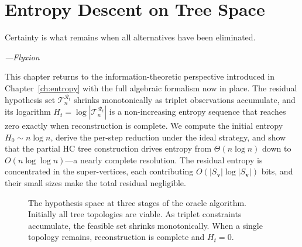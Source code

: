 \chapter{Entropy Descent on Tree Space}
\label{ch:entropy_descent}

\epigraph{%
  Certainty is what remains when all alternatives have been eliminated.%
}{\textit{---Flyxion}}

This chapter returns to the information-theoretic perspective introduced in Chapter~\ref{ch:entropy} with the full algebraic formalism now in place. The residual hypothesis set $\mathcal{T}_n^{\mathcal{R}_t}$ shrinks monotonically as triplet observations accumulate, and its logarithm $H_t = \log|\mathcal{T}_n^{\mathcal{R}_t}|$ is a non-increasing entropy sequence that reaches zero exactly when reconstruction is complete. We compute the initial entropy $H_0 \sim n\log n$, derive the per-step reduction under the ideal strategy, and show that the partial HC tree construction drives entropy from $\Theta(n\log n)$ down to $O(n\log\log n)$---a nearly complete resolution. The residual entropy is concentrated in the super-vertices, each contributing $O(|S_\mathbf{v}|\log|S_\mathbf{v}|)$ bits, and their small sizes make the total residual negligible.

\begin{figure}[ht]
\centering
{}
\caption{The hypothesis space at three stages of the oracle algorithm. Initially all tree topologies are viable. As triplet constraints accumulate, the feasible set shrinks monotonically. When a single topology remains, reconstruction is complete and $H_t = 0$.}
\label{fig:hypothesis_landscape}
\end{figure}

